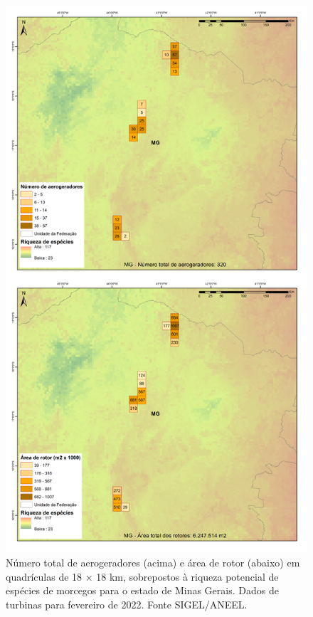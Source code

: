 \documentclass[
  oneside]{scrbook}
\begin{document}
\begin{figure}[H]

{\centering \includegraphics[width=0.75\linewidth]{imagens/cap09/Figura_9.13} 

}

\caption{Número total de aerogeradores (acima) e área de rotor (abaixo) em quadrículas de 18 × 18 km, sobrepostos à riqueza potencial de espécies de morcegos para o estado de Minas Gerais. Dados de turbinas para fevereiro de 2022. Fonte SIGEL/ANEEL.}\label{fig:78}
\end{figure}
\end{document}
